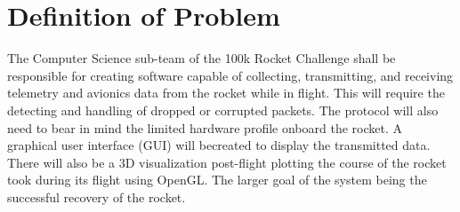 \documentclass[onecolumn, draftclsnofoot,10pt, compsoc]{IEEEtran}
\begin{document}
\begin{titlepage}
\begin{singlespace}
\begin{abstract}
        \end{abstract}     
    \end{singlespace}
\end{titlepage}
\newpage
{}
\tableofcontents
\clearpage

\section{Definition of Problem}
The Computer Science sub-team of the 100k Rocket Challenge shall be responsible for creating software capable of collecting, transmitting, and receiving telemetry and avionics data from the rocket while in flight. This will require the detecting and handling of dropped or corrupted packets. The protocol will also need to bear in mind the limited hardware profile onboard the rocket. A graphical user interface (GUI) will becreated to display the transmitted data. There will also be a 3D visualization post-flight plotting the course of the rocket took during its flight using OpenGL. The larger goal of the system being the successful recovery of the rocket.\par
\end{document}

